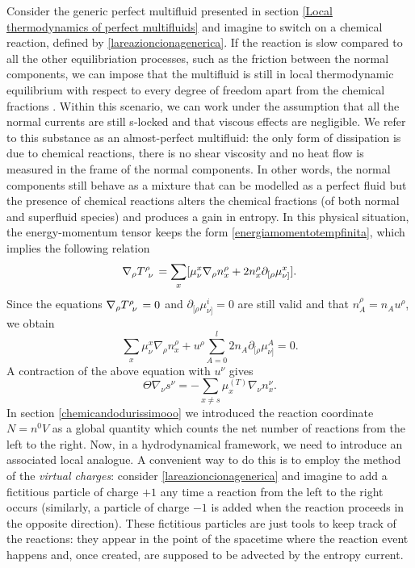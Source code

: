 \documentclass[usenatbib]{mnras}
\begin{document}
Consider the generic perfect multifluid presented in section \ref{Local thermodynamics of perfect multifluids} and imagine to switch on a chemical reaction, defined by \eqref{lareazioncionagenerica}. 
If the reaction is  slow compared to all the other equilibriation processes, such as the friction between the normal components, we can impose that the multifluid is still in local thermodynamic equilibrium with respect to every degree of freedom apart from the chemical fractions \citep{haensel_frozen}. Within this scenario, we can work under the  assumption that all the normal currents are still s-locked and that viscous effects are negligible.
We refer to this substance as an almost-perfect multifluid: the only form of dissipation is due to chemical reactions, there is no shear viscosity and no heat flow is measured in the frame of the normal components. In other words, the normal components still behave as a mixture that can be modelled as a perfect fluid but the presence of chemical reactions alters the chemical fractions (of both normal and superfluid species) and produces a gain in entropy.
In this physical situation, the energy-momentum tensor keeps the form \eqref{energiamomentotempfinita}, which implies the following relation
%
\begin{equation}
\nabla_\rho T\indices{^\rho _\nu} = \sum_x [\mu^x_\nu\nabla_\rho n_x^\rho + 2n_x^\rho \partial_{[\rho}\mu^x_{\nu]}].
\end{equation} 
%
Since the equations $\nabla_\rho T\indices{^\rho _\nu}=0$ and $\partial_{[\rho}\mu^i_{\nu]}=0$ are still valid and that $n_A^\rho = n_A u^\rho$, we obtain
%
\begin{equation}\label{dwodwoedmwemod}
\sum_x \mu^x_\nu\nabla_\rho n_x^\rho + u^\rho \sum_{A=0}^l 2n_A \partial_{[\rho}\mu^A_{\nu]} =0.
\end{equation}
%
A contraction of the above equation with $u^\nu$ gives
%
\begin{equation}\label{delmaialenonsibuttavianiente}
\Theta \nabla_\nu s^\nu = -\sum_{x \neq s} \mu_x^{(T)} \nabla_\nu n_x^\nu.
\end{equation}
%
In section \ref{chemicandodurissimooo} we introduced the reaction coordinate $N=n^0 V$ as a global quantity which counts the net number of reactions from the left to the right. Now, in a hydrodynamical framework, we need to introduce an associated local analogue. A convenient way to do this is to employ the method of the 
\emph{virtual charges}: 
consider \eqref{lareazioncionagenerica} and imagine to add a fictitious particle of charge $+1$ any time a reaction from the left to the right occurs (similarly, a particle of charge $-1$ is added when the reaction proceeds in the opposite direction). These fictitious particles are just tools to keep track of the reactions: they appear in the point of the spacetime where the reaction event happens and, once created,   are supposed to be advected by the entropy current. 
 
\end{document}
